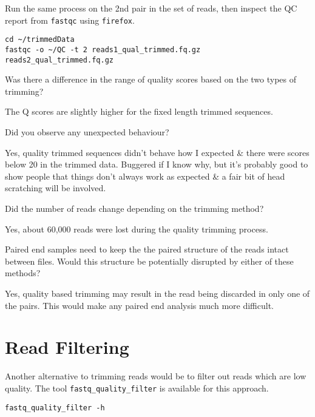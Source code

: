 \begin{steps}
Run the same process on the 2nd pair in the set of reads, then inspect the QC report from \texttt{fastqc} using \texttt{firefox}.
\begin{lstlisting}
cd ~/trimmedData
fastqc -o ~/QC -t 2 reads1_qual_trimmed.fq.gz reads2_qual_trimmed.fq.gz
\end{lstlisting}
\end{steps}

\begin{questions}
Was there a difference in the range of quality scores based on the two types of trimming? \\
\begin{answer}
The Q scores are slightly higher for the fixed length trimmed sequences. \\
\end{answer}

Did you observe any unexpected behaviour? \\
\begin{answer}
Yes, quality trimmed sequences didn't behave how I expected \& there were scores below 20 in the trimmed data.
Buggered if I know why, but it's probably good to show people that things don't always work as expected \& a fair bit of head scratching will be involved. \\
\end{answer}

Did the number of reads change depending on the trimming method? \\
\begin{answer}
Yes, about 60,000 reads were lost during the quality trimming process. \\
\end{answer}

Paired end samples need to keep the the paired structure of the reads intact between files.
Would this structure be potentially disrupted by either of these methods? \\
\begin{answer}
Yes, quality based trimming may result in the read being discarded in only one of the pairs. 
This would make any paired end analysis much more difficult. \\
\end{answer}
\end{questions}

\section{Read Filtering}
Another alternative to trimming reads would be to filter out reads which are low quality.
The tool \texttt{fastq_quality_filter} is available for this approach.
\begin{lstlisting}
fastq_quality_filter -h
\end{lstlisting}

